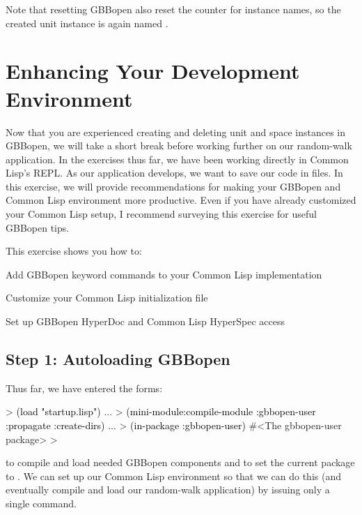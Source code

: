\documentclass[10pt,twoside,english,pdftex]{article}
\begin{document}
Note that resetting GBBopen also reset the counter for 
instance names, so the created unit instance is again named .


\T\markright{}%
\T\pagestyle{plain}
\T\cleardoublepage
\W{}
\T\pagestyle{fancy}
\T\thispagestyle{fancybottom}
\T\renewcommand{\headrulewidth}{0pt}
\section{Enhancing Your Development Environment}
\label{sec:environment}%

Now that you are experienced creating and deleting unit and space instances in
GBBopen, we will take a short break before working further on our random-walk
application.  In the exercises thus far, we have been working directly in
Common Lisp's REPL.  As our application develops, we want to save our code in
files. In this exercise, we will provide recommendations for making your
GBBopen and Common Lisp environment more productive.  Even if you have already
customized your Common Lisp setup, I recommend surveying this exercise for
useful GBBopen tips.

\fndocrule

This exercise shows you how to:
\begin{tightitemize}
\item Add GBBopen keyword commands to your Common Lisp implementation
\item Customize your Common Lisp initialization file
\item Set up GBBopen HyperDoc and Common Lisp HyperSpec access
\end{tightitemize}

\fndocrule

\subsection*{Step 1: Autoloading GBBopen}

Thus far, we have entered the forms:
%
\begin{example}\color{darkergray}%
  > \textcolor{black}{(load "startup.lisp")}
     ...
  > \textcolor{black}{(mini-module:compile-module :gbbopen-user :propagate :create-dirs)}
     ...
  > \textcolor{black}{(in-package :gbbopen-user)}
  #<The gbbopen-user package>
  >
\end{example}
%
to compile and load needed GBBopen components and to set the current package
to .  We can set up our Common Lisp environment so that we
can do this (and eventually compile and load our random-walk application) by
issuing only a single command.
\end{document}
